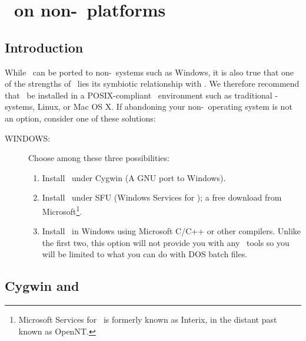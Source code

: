 %
%
\chapter{\gmt\ on non-\UNIX\ platforms}
\label{app:L}
\thispagestyle{headings}

\section{Introduction}

While \GMT\ can be ported to non-\UNIX\ systems such as
Windows, it is also true that one of the
strengths of \GMT\ lies its symbiotic relationship with
\UNIX.  We therefore recommend that \GMT\ be installed in
a POSIX-compliant \UNIX\ environment such as traditional \UNIX-systems, Linux,
or Mac OS X.  If abandoning your non-\UNIX\ operating system
is not an option, consider one of these solutions:

\begin{description}
\item [WINDOWS:] Choose among these three possibilities:

\begin{enumerate}

\item Install \GMT\ under Cygwin (A GNU port to Windows). 

\item Install \GMT\ under SFU (Windows Services for \UNIX); a free download from
Microsoft\footnote{Microsoft Services for \UNIX\ is formerly known as Interix, in the distant past known as OpenNT.}.

\item Install \GMT\ in Windows using Microsoft C/C++ or other
compilers.  Unlike the first two, this option will not provide you with any
\UNIX\ tools so you will be limited to what you can do with
DOS batch files.


\end{enumerate}

\end{description}

\section{Cygwin and \gmt}

